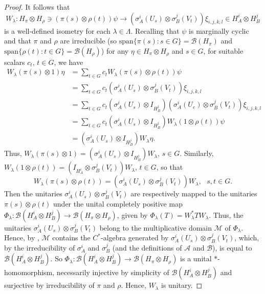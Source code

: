 \documentclass[11pt]{amsart}
\theoremstyle{definition}
\newcommand{\cl}[1]{\mathcal{#1}}
\newcommand{\ten}{\otimes}
\begin{document}
\begin{proof}
It follows that 
$$W_\lambda:H_\pi\ten H_\rho\ni (\pi(s)\ten\rho(t))\psi\to(\sigma_A^i(U_{s})\ten\sigma_B^j(V_{t}))\xi_{i,j,k,l}\in H_A^i\ten H_B^j$$
is a well-defined isometry for each $\lambda\in\Lambda$. Recalling that $\psi$ is marginally cyclic 
and that $\pi$ and $\rho$ are irreducible (so $\mathrm{span}\{\pi(s) : s\in G\}=\cl{B}(H_\pi)$ and $\mathrm{span}\{\rho(t) : t\in G\}=\cl{B}(H_\rho)$) for any $\eta\in H_\pi\ten H_{\rho}$ and $s\in G$, for suitable scalars $c_t$, 
$t\in G$, we have 
\begin{align*}W_\lambda(\pi(s)\ten1)\eta&=\sum_{t\in G}c_tW_\lambda(\pi(s)\ten\rho(t))\psi\\
&=\sum_{t\in G}c_t (\sigma_A^i(U_{s})\ten\sigma_B^j(V_{t}))\xi_{i,j,k,l}\\
&=\sum_{t\in G}c_t (\sigma_A^i(U_{s})\ten I_{H_B^j})(\sigma_A^i(U_{e})\ten\sigma_B^j(V_{t}))\xi_{i,j,k,l}\\
&=\sum_{t\in G}c_t (\sigma_A^i(U_{s})\ten I_{H_B^j})W_\lambda(1\ten\rho(t))\psi\\
&=(\sigma_A^i(U_{s})\ten I_{H_B^j})W_\lambda\eta.
\end{align*}
Thus, $W_\lambda(\pi(s)\ten1)=(\sigma_A^i(U_{s})\ten I_{H_B^j})W_\lambda$, $s\in G$. Similarly, $W_\lambda(1\ten\rho(t))=(I_{H_A^i}\ten \sigma_B^j(V_t))W_\lambda$, $t\in G$, so that
$$W_\lambda(\pi(s)\ten\rho(t))=(\sigma_A^i(U_{s})\ten \sigma_B^j(V_t))W_\lambda, \ \ \ s,t\in G.$$
Then the unitaries $\sigma_A^i(U_{s})\ten \sigma_B^j(V_t)$ are respectively mapped to the unitaries $\pi(s)\ten \rho(t)$ under the unital completely positive map 
$\Phi_{\lambda} : \cl{B}(H_A^i\ten H_B^j)\to\cl{B}(H_\pi\ten H_\rho)$, 
given by $\Phi_{\lambda}(T) = W_\lambda^* T W_\lambda$.
Thus, the unitaries $\sigma_A^i(U_{s})\ten \sigma_B^j(V_t)$ 
belong to the multiplicative domain $\cl{M}$ of $\Phi_{\lambda}$. Hence, by \cite[Proposition 1.5.7]{BO}, $\cl{M}$ contains the $C^*$-algebra generated by $\sigma_A^i(U_{s})\ten \sigma_B^j(V_t)$, which, by the irreducibility of $\sigma_A^i$ and $\sigma_B^j$ (and the definitions of $\cl A$ and $\cl B$), is equal to $\cl{B}(H_A^i\ten H_B^j)$. So $\Phi_\lambda:\cl{B}(H_A^i\ten H_B^j)\to\cl{B}(H_\pi\ten H_\rho)$ is a unital $*$-homomorphism, necessarily injective by simplicity of $\cl{B}(H_A^i\ten H_B^j)$ and surjective by irreducibility of $\pi$ and $\rho$. Hence, $W_\lambda$ is unitary.


\end{proof}
\end{document}
